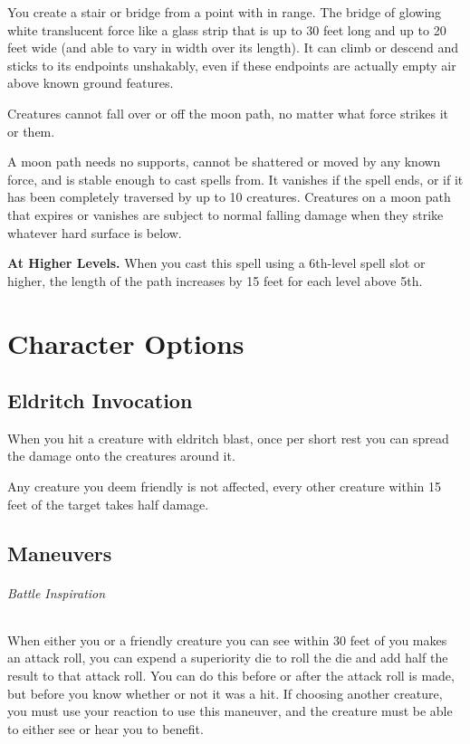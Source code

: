 \documentclass[letter,10pt,twocolumn,openany]{dndbook}
\begin{document}
You create a stair or bridge from a point with in range. The bridge of glowing white translucent force like a glass strip that is up to 30 feet long and up to 20 feet wide (and able to vary in width over its length). It can climb or descend and sticks to its endpoints unshakably, even if these endpoints are actually empty air above known ground features.

Creatures cannot fall over or off the moon path, no matter what force strikes it or them.

A moon path needs no supports, cannot be shattered or moved by any known force, and is stable enough to cast spells from. It vanishes if the spell ends, or if it has been completely traversed by up to 10 creatures. Creatures on a moon path that expires or vanishes are subject to normal falling damage when they strike whatever hard surface is below.

\textbf{At Higher Levels.} When you cast this spell using a 6th-level spell slot or higher, the length of the path increases by 15 feet for each level above 5th.

\chapter{Character Options}

\section{Eldritch Invocation}


When you hit a creature with eldritch blast, once per short rest you can spread the damage onto the creatures around it.

Any creature you deem friendly is not affected, every other creature within 15 feet of the target takes half damage.

\section{Maneuvers}

\subparagraph{Battle Inspiration}
When either you or a friendly creature you can see within 30 feet of you makes an attack roll, you can expend a superiority die to roll the die and add half the result to that attack roll. You can do this before or after the attack roll is made, but before you know whether or not it was a hit. If choosing another creature, you must use your reaction to use this maneuver, and the creature must be able to either see or hear you to benefit.
\end{document}
